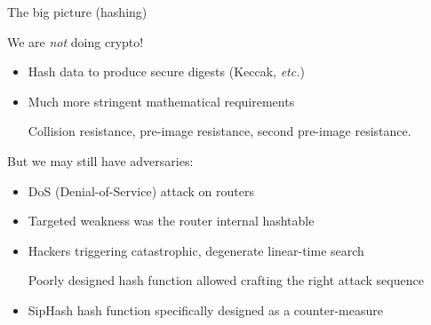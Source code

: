 \begin{frame}[fragile]{The big picture (hashing)}

  We are {\em not} doing crypto!
  \begin{itemize}
  \item Hash data to produce secure digests (Keccak, {\em etc.})
  \item Much more stringent mathematical requirements

    Collision resistance, pre-image resistance, second pre-image resistance.
  \end{itemize}

  But we may still have adversaries:
  \begin{itemize}
  \item DoS (Denial-of-Service) attack on routers

  \item Targeted weakness was the router internal hashtable

  \item Hackers triggering catastrophic, degenerate linear-time search

    Poorly designed hash function allowed crafting the right attack sequence

  \item SipHash hash function specifically designed as a counter-measure
  \end{itemize}

\end{frame}


